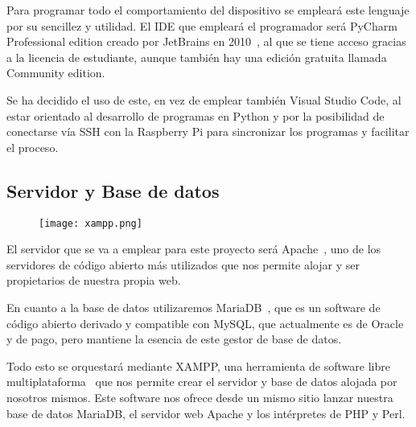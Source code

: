 Para programar todo el comportamiento del dispositivo se empleará este lenguaje por su sencillez y utilidad. El IDE que empleará el programador será PyCharm Professional edition creado por JetBrains en 2010~\cite{noauthor_pycharm_2021}, al que se tiene acceso gracias a la licencia de estudiante, aunque también hay una edición gratuita llamada Community edition.

Se ha decidido el uso de este, en vez de emplear también Visual Studio Code, al estar orientado al desarrollo de programas en Python y por la posibilidad de conectarse vía SSH con la Raspberry Pi para sincronizar los programas y facilitar el proceso.

\subsection{Servidor y Base de datos}\label{subsec:servidorDB}
\begin{figure}[H]
	{\texttt{[image: xampp.png]}}\label{fig:logoXAMPP}
\end{figure}
El servidor que se va a emplear para este proyecto será Apache~\cite{the_apache_software_foundation_apache_nodate}, uno de los servidores de código abierto más utilizados que nos permite alojar y ser propietarios de nuestra propia web.

En cuanto a la base de datos utilizaremos MariaDB~\cite{mariadb_foundation_mariadb_nodate}, que es un software de código abierto derivado y compatible con MySQL, que actualmente es de Oracle y de pago, pero mantiene la esencia de este gestor de base de datos.

Todo esto se orquestará mediante XAMPP, una herramienta de software libre multiplataforma~\cite{vmware_xampp_nodate} que nos permite crear el servidor y base de datos alojada por nosotros mismos. Este software nos ofrece desde un mismo sitio lanzar nuestra base de datos MariaDB, el servidor web Apache y los intérpretes de PHP y Perl.
